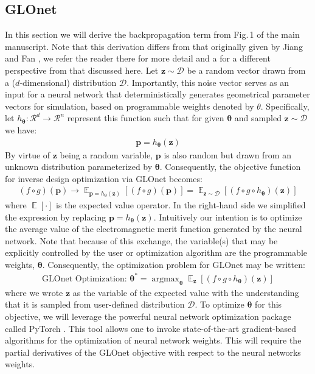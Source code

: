 \documentclass{article}
\DeclareMathOperator*{\argmax}{argmax}
\DeclareMathOperator*{\EX}{\mathbb{E}}%
\begin{document}
\subsection{GLOnet}
In this section we will derive the backpropagation term from Fig.\,1 of the main manuscript. Note that this derivation differs from that originally given by Jiang and Fan \cite{jiang_global_2019,jiang_simulator-based_2020}, we refer the reader there for more detail and a for a different perspective from that discussed here.  Let $\mathbf{z}\sim \mathcal{D}$ be a random vector drawn from a ($d$-dimensional) distribution $\mathcal{D}$. Importantly, this noise vector serves as an input for a neural network that deterministically generates geometrical parameter vectors for simulation, based on programmable weights denoted by $\theta$. Specifically, let $h_{\boldsymbol{\theta}}: \mathcal{R}^d\rightarrow\mathcal{R}^n$ represent this function such that for given $\boldsymbol{\theta}$ and sampled $\mathbf{z}\sim\mathcal{D}$ we have:
\begin{align}
    \mathbf{p} = h_{\boldsymbol{\theta}} (\mathbf{z})
\end{align}
By virtue of $\mathbf{z}$ being a random variable, $\mathbf{p}$ is also random but drawn from an unknown distribution parameterized by $\boldsymbol{\theta}$. Consequently, the objective function for inverse design optimization via GLOnet becomes:
\begin{align}
    (f\circ g)(\mathbf{p}) \rightarrow \EX_{\mathbf{p}=h_{\boldsymbol{\theta}} (\mathbf{z})} [(f\circ g)(\mathbf{p})] = \EX_{\mathbf{z}\sim \mathcal{D}} [(f\circ g \circ h_{\boldsymbol{\theta}})(\mathbf{z})]
\end{align}
where $\EX[\cdot]$ is the expected value operator. In the right-hand side we simplified the expression by replacing $\mathbf{p}=h_{\boldsymbol{\theta}} (\mathbf{z})$. Intuitively our intention is to optimize the average value of the electromagnetic merit function generated by the neural network. Note that because of this exchange, the variable(s) that may be explicitly controlled by the user or optimization algorithm are the programmable weights, $\boldsymbol{\theta}$. Consequently, the optimization problem for GLOnet may be written:
\begin{align}
    \boxed{\text{GLOnet Optimization: } \boldsymbol{\theta}^* = \argmax_{\boldsymbol{\theta}} \EX_{\mathbf{z}} [(f\circ g \circ h_{\boldsymbol{\theta}})(\mathbf{z})]}\label{eq:glonet}
\end{align}
where we wrote $\mathbf{z}$ as the variable of the expected value with the understanding that it is sampled from user-defined distribution $\mathcal{D}$. To optimize $\boldsymbol{\theta}$ for this objective, we will leverage the powerful neural network optimization package called PyTorch \cite{paszke2017automatic}. This tool allows one to invoke state-of-the-art gradient-based algorithms for the optimization of neural network weights. This will require the partial derivatives of the GLOnet objective with respect to the neural networks weights. 
\end{document}
